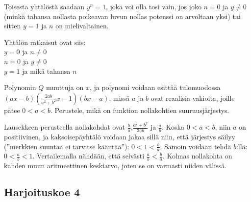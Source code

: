 \begin{multicols}{2}
\begin{tehtava}
\begin{vastaus}
Toisesta yhtälöstä saadaan $y^n=1$, joka voi olla tosi vain, jos joko $n=0$ ja $y \neq 0$ (minkä tahansa nollasta poikeavan luvun nollas potenssi on arvoltaan yksi) tai sitten $y=1$ ja $n$ on mielivaltainen.

Yhtälön ratkaisut ovat siis: \\
$y=0$ ja $n \neq 0$ \\
$n=0$ ja $y \neq 0$ \\
$y=1$ ja mikä tahansa $n$
	\end{vastaus}
\end{tehtava}

\begin{tehtava}
Polynomin $Q$ muuttuja on $x$, ja polynomi voidaan esittää tulomuodossa $(ax-b)(\frac{2ab}{a^2+b^2}x-1)(bx-a)$, missä $a$ ja $b$ ovat reaalisia vakioita, joille pätee $0<a<b$. Perustele, mikä on funktion nollakohtien suuruusjärjestys.
		\begin{vastaus}
Lausekkeen perusteella nollakohdat ovat $\frac{b}{a}$,$\frac{a^2+b^2}{2ab}$ ja $\frac{a}{b}$. Koska $0<a<b$, niin $a$ on positiivinen, ja kaksoisepäyhtälö voidaan jakaa sillä niin, että järjestys säilyy (''merkkien suuntaa ei tarvitse kääntää''): $0<1<\frac{b}{a}$. Samoin voidaan tehdä $b$:llä: $0<\frac{a}{b}<1$. Vertailemalla nähdään, että selvästi $\frac{a}{b}<\frac{b}{a}$. Kolmas nollakohta on kahden muun aritmeettinen keskiarvo, joten se on varmasti niiden välissä.
		\end{vastaus}
\end{tehtava}
\end{multicols}
\newpage

\subsection*{Harjoituskoe 4}

